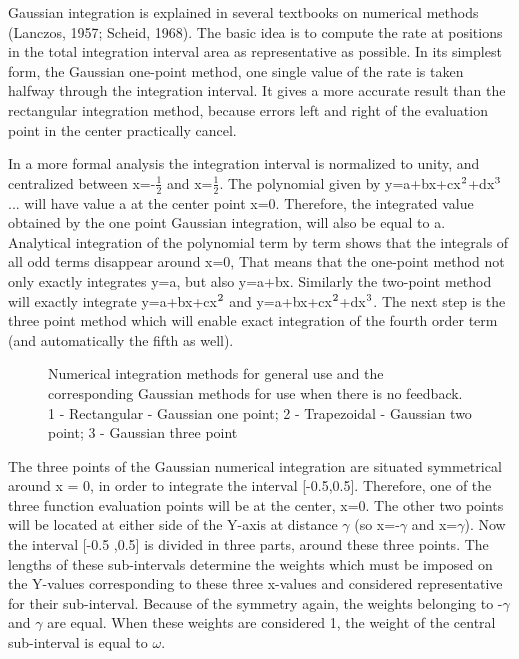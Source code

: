 Gaussian integration is explained in several textbooks on numerical methods (Lanczos, 1957;
Scheid, 1968). The basic idea is to compute the rate at positions in the total integration
interval area as representative as possible. In its simplest form, the Gaussian one-point
method, one single value of the rate is taken halfway through the integration interval. It
gives a more accurate result than the rectangular integration method, because errors left and
right of the evaluation point in the center practically cancel.

In a more formal analysis the integration interval is normalized to unity, and centralized
between x=-$\frac{1}{2}$ and x=$\frac{1}{2}$. The polynomial given by 
y=a+bx+cx$^{{\rm 2}}$+dx$^{{\rm 3}}$ ... will have value
a at the center point x=0. Therefore, the integrated value obtained by the one point
Gaussian integration, will also be equal to a. Analytical integration of the polynomial term
by term shows that the integrals of all odd terms disappear around x=0, That means that
the one-point method not only exactly integrates y=a, but also y=a+bx. Similarly the two-point 
method will exactly integrate y=a+bx+cx$^{{\rm 2}}$ and y=a+bx+cx$^{{\rm 2}}$+dx$^{{\rm 3}}$. 
The next step is the three point method which will enable exact integration of the fourth order 
term (and automatically the fifth as well).
 
\begin{figure}
 \centering
\caption{Numerical integration methods for general use and the corresponding Gaussian
    methods for use when there is no feedback. 1 - Rectangular - Gaussian one point; 
    2 - Trapezoidal - Gaussian two point; 3 - Gaussian three point}
\end{figure}
     
The three points of the Gaussian numerical integration are situated symmetrical around x =
0, in order to integrate the interval [-0.5,0.5]. Therefore, one of the three function
evaluation points will be at the center, x=0. The other two points will be located at either
side of the Y-axis at distance $\gamma$ (so x=-$\gamma$ and x=$\gamma$). Now the interval [-0.5 ,0.5] is divided
in three parts, around these three points. The lengths of these sub-intervals determine the
weights which must be imposed on the Y-values corresponding to these three x-values and
considered representative for their sub-interval. Because of the symmetry again, the weights
belonging to -$\gamma$ and $\gamma$ are equal. When these weights are considered 1, the weight of the
central sub-interval is equal to $\omega$.

